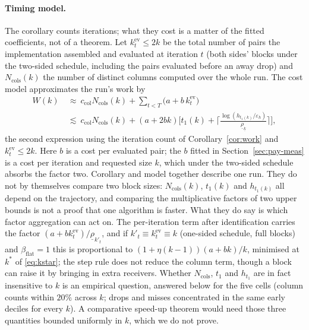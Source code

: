 \paragraph{Timing model.} The corollary counts iterations; what they
cost is a matter of the fitted coefficients, not of a theorem. Let
$k^{\mathrm{ev}}_t\le2k$ be the total number of pairs the implementation
assembled and evaluated at iteration $t$ (both sides' blocks under the
two-sided schedule, including the pairs evaluated before an away drop)
and $N_{\mathrm{cols}}(k)$ the number of distinct columns computed over
the whole run. The cost model approximates the run's work by
\begin{align*}
W(k)&\ \approx\ c_{\mathrm{col}}N_{\mathrm{cols}}(k)+\sum_{t<T}\big(a+b\,k^{\mathrm{ev}}_t\big)\\
&\ \lesssim\ c_{\mathrm{col}}N_{\mathrm{cols}}(k)+(a+2bk)\Big[t_1(k)+\Big\lceil\frac{\log(h_{t_1(k)}/\varepsilon_h)}{\underline\rho_{\underline k}}\Big\rceil\Big],
\end{align*}
the second expression using the iteration count of
Corollary~\ref{cor:work} and $k^{\mathrm{ev}}_t\le2k$. Here $b$ is a
cost per evaluated pair; the $b$ fitted in Section~\ref{sec:pay-meas}
is a cost per iteration and requested size $k$, which under the
two-sided schedule absorbs the factor two.
Corollary and model together describe one run. They do not by
themselves compare two block sizes: $N_{\mathrm{cols}}(k)$, $t_1(k)$ and
$h_{t_1(k)}$ all depend on the trajectory, and comparing the
multiplicative factors of two upper bounds is not a proof that one
algorithm is faster. What they do say is which factor aggregation can act
on. The per-iteration term after identification carries the factor
$(a+bk^{\mathrm{ev}}_t)/\underline\rho_{k'_t}$, and if
$k'_t\equiv k^{\mathrm{ev}}_t\equiv k$ (one-sided schedule, full blocks)
and $\beta_{\mathrm{flat}}=1$ this is proportional to
$(1+\eta(k-1))(a+bk)/k$, minimised at $k^*$ of
\eqref{eq:kstar}; the step rule does not reduce the column term, though
a block can raise it by bringing in extra receivers. Whether $N_{\mathrm{cols}}$, $t_1$ and $h_{t_1}$ are in fact
insensitive to $k$ is an empirical question, answered below for the
five cells (column counts within $20\%$ across $k$; drops and misses
concentrated in the same early deciles for every $k$). A comparative
speed-up theorem would need those three quantities bounded uniformly in
$k$, which we do not prove.

